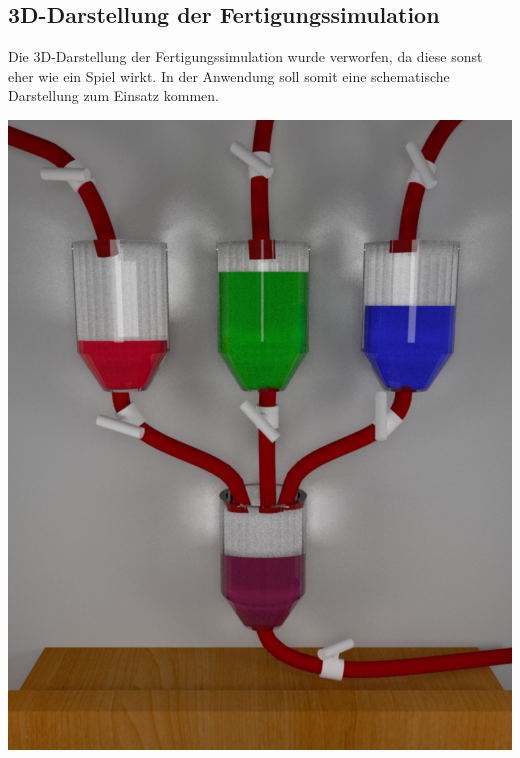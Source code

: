 \documentclass[parskip=full]{scrartcl}
\begin{document}
\subsection{3D-Darstellung der Fertigungssimulation}
Die 3D-Darstellung der \gls{Fertigungssimulation} wurde verworfen, da diese sonst eher wie ein Spiel wirkt.
In der Anwendung soll somit eine schematische Darstellung zum Einsatz kommen.
\begin{center}
  \includegraphics[scale=0.3]{./media/ui-sketch-server-3d.png}
\end{center}

\pagebreak
\printglossaries
\end{document}
